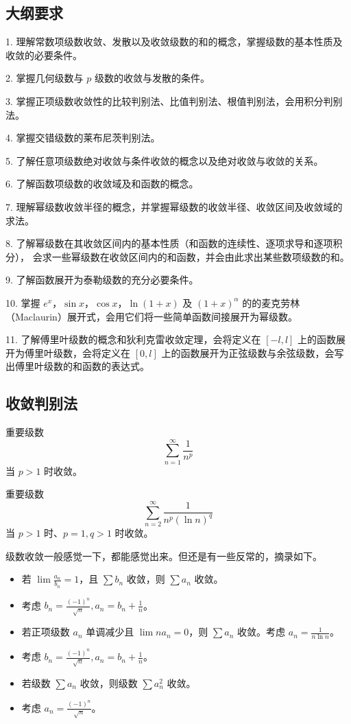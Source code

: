 \subsection{大纲要求}

1. 理解常数项级数收敛、发散以及收敛级数的和的概念，掌握级数的基本性质及收敛的必要条件。

2. 掌握几何级数与 $p$ 级数的收敛与发散的条件。

3. 掌握正项级数收敛性的比较判别法、比值判别法、根值判别法，会用积分判别法。

4. 掌握交错级数的莱布尼茨判别法。

5. 了解任意项级数绝对收敛与条件收敛的概念以及绝对收敛与收敛的关系。

6. 了解函数项级数的收敛域及和函数的概念。

7. 理解幂级数收敛半径的概念，并掌握幂级数的收敛半径、收敛区间及收敛域的求法。

8. 了解幂级数在其收敛区间内的基本性质（和函数的连续性、逐项求导和逐项积分），
会求一些幂级数在收敛区间内的和函数，并会由此求出某些数项级数的和。

9. 了解函数展开为泰勒级数的充分必要条件。

10. 掌握 $e^x$，$\sin x$，$\cos x$，$\ln(1+x)$ 及 $(1+x)^{\alpha}$ 的的麦克劳林（Maclaurin）展开式，会用它们将一些简单函数间接展开为幂级数。

11. 了解傅里叶级数的概念和狄利克雷收敛定理，会将定义在 $[-l, l]$ 上的函数展开为傅里叶级数，会将定义在 $[0, l]$ 上的函数展开为正弦级数与余弦级数，会写出傅里叶级数的和函数的表达式。

\subsection{收敛判别法}

重要级数
\[ \sum_{n=1}^\infty {\frac{1}{n^p}} \]
当 $p > 1$ 时收敛。

重要级数
\[ \sum_{n=2}^\infty {\frac{1}{n^p (\ln n)^q}} \]
当 $p > 1$ 时、$p=1, q > 1$ 时收敛。

级数收敛一般感觉一下，都能感觉出来。但还是有一些反常的，摘录如下。
\begin{itemize}
	\item 若 $\lim \frac{a_n}{b_n} = 1$，且 $\sum b_n$ 收敛，则 $\sum a_n$ 收敛。
	\item 考虑 $b_n = \frac{(-1)^n}{\sqrt{n}}, a_n = b_n + \frac{1}{n}$。
	\item 若正项级数 $a_n$ 单调减少且 $\lim n a_n = 0$，则 $\sum a_n$ 收敛。考虑 $a_n = \frac{1}{n \ln n}$。
	\item 考虑 $b_n = \frac{(-1)^n}{\sqrt{n}}, a_n = b_n + \frac{1}{n}$。
	\item 若级数 $\sum a_n$ 收敛，则级数 $\sum a_n^2$ 收敛。
	\item 考虑 $a_n = \frac{(-1)^n}{\sqrt{n}}$。
\end{itemize}

